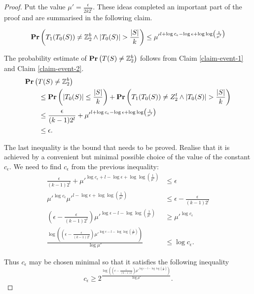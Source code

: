 \begin{proof}
Put the value $\mu' = \frac{\epsilon}{2k2 ^ l}$. These ideas completed an important part of the proof and are summarised in the following claim.
\begin{claim}
\label{claim-event-2}
\[
	\mathbf{Pr}\left(T_1(T_0(S)) \neq \mathbb{Z}_{2}^{b} \wedge |T_0(S)| > \frac{|S|}{k}\right) \leq {\mu'} ^ {l + \log c_\epsilon - \log \epsilon + \log \log \left(\frac{1}{\mu'}\right)}
\]
\end{claim}

The probability estimate of $\mathbf{Pr}\left(T(S) \neq \mathbb{Z}_{2}^{b}\right)$ follows from Claim \ref{claim-event-1} and Claim \ref{claim-event-2}.
\[
\begin{split}
& \mathbf{Pr}\left(T(S) \neq \mathbb{Z}_{2}^{b}\right) \\
	& \qquad \leq \mathbf{Pr}\left(|T_0(S)| \leq \frac{|S|}{k}\right) + \mathbf{Pr}\left(T_1(T_0(S)) \neq Z_2^t \wedge |T_0(S)| > \frac{|S|}{k}\right) \\ 
	& \qquad \leq \frac{\epsilon}{(k - 1) 2 ^ l} + {\mu'} ^ {l + \log c_\epsilon - \log \epsilon + \log \log \left(\frac{1}{\mu'}\right)} \\
	& \qquad \leq \epsilon \text{.}
\end{split}
\]

The last inequality is the bound that needs to be proved. Realise that it is achieved by a convenient but minimal possible choice of the value of the constant $c_\epsilon$. We need to find $c_\epsilon$ from the previous inequality:
\[
\begin{split}
\frac{\epsilon}{(k - 1) 2 ^ l} + {\mu'}^{\log c_\epsilon + l - \log \epsilon + \log \log \left(\frac{1}{\mu'}\right)} & \leq \epsilon \\
{\mu'}^{\log c_\epsilon}{\mu'}^{l - \log \epsilon + \log \log \left(\frac{1}{\mu'}\right)} & \leq \epsilon - \frac{\epsilon}{(k - 1) 2 ^ l} \\
\left(\epsilon - \frac{\epsilon}{(k - 1) 2 ^ l}\right) {\mu'}^{\log \epsilon - l - \log \log \left(\frac{1}{\mu'}\right)} & \geq {\mu'}^{\log c_\epsilon} \\
\frac{\log \left( \left( \epsilon - \frac{\epsilon}{(k - 1) 2 ^ l}\right) {\mu'}^{\log \epsilon - l - \log \log \left(\frac{1}{\mu'}\right)}\right)}{\log \mu'} & \leq {\log c_\epsilon} \text{.}
\end{split}
\]

Thus $c_\epsilon$ may be chosen minimal so that it satisfies the following inequality
\begin{equation}
\label{inequality-good-c-e}
c_\epsilon \geq 2 ^ {\frac{\log \left( \left( \epsilon - \frac{\epsilon}{(k - 1) 2 ^ l}\right) {\mu'}^{\log \epsilon - l - \log \log \left(\frac{1}{\mu'}\right)}\right)}{\log \mu'}} \text{.}
\end{equation}
\end{proof}

